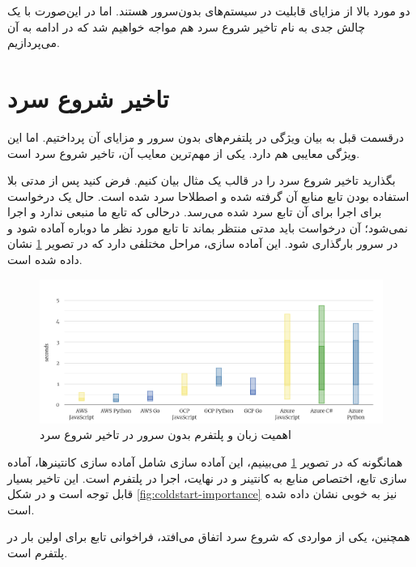 دو مورد بالا از مزایای قابلیت  در سیستم‌های بدون‌سرور هستند. اما در این‌صورت با یک چالش جدی به نام تاخیر شروع سرد هم مواجه خواهیم شد که در ادامه به آن می‌پردازیم. 


\section{تاخیر شروع سرد}

درقسمت قبل به بیان ویژگی  در پلتفرم‌های بدون سرور و مزایای آن پرداختیم. اما این ویژگی معایبی هم دارد. یکی از مهم‌ترین معایب آن، تاخیر شروع سرد است. 

بگذارید تاخیر شروع سرد را در قالب یک مثال بیان کنیم. فرض کنید پس از مدتی بلا استفاده بودن تابع منابع آن گرفته شده و اصطلاحا سرد شده است. حال یک درخواست برای اجرا برای آن تابع سرد شده می‌رسد. درحالی که تابع ما منبعی ندارد و اجرا نمی‌شود؛ آن درخواست  باید مدتی منتظر بماند تا تابع مورد نظر ما دوباره آماده شود و در سرور بارگذاری شود. این آماده سازی، مراحل مختلفی دارد که در تصویر \ref{fig:ColdStart-programming-languages} نشان داده شده است. 

\begin{figure}
	\centering
	\includegraphics[width=\linewidth]{figs/ColdStart-programming-languages}
	\caption {اهمیت زبان و پلتفرم بدون سرور در تاخیر شروع سرد}
	\label{fig:ColdStart-programming-languages}
\end{figure}

\par
همانگونه که در تصویر \ref{fig:ColdStart-programming-languages} می‌بینیم، این آماده سازی شامل آماده سازی کانتینر‌ها، آماده سازی تابع، اختصاص منابع به کانتینر و در نهایت، اجرا در پلتفرم است. این تاخیر بسیار قابل توجه است و در شکل \ref{fig:coldstart-importance} نیز به خوبی نشان داده شده است. 

\par
همچنین،‌ یکی از مواردی که شروع سرد اتفاق می‌افتد، فراخوانی تابع برای اولین بار در پلتفرم است. 

